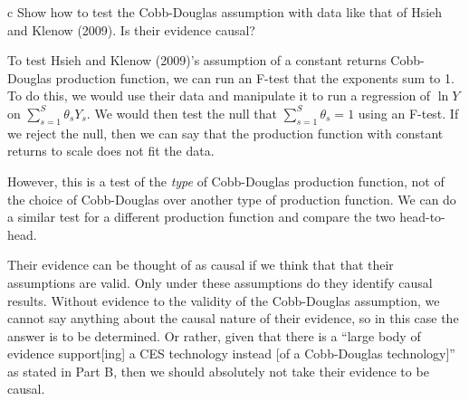 \documentclass{article}
\begin{document}
\begin{problem}{c}
Show how to test the Cobb-Douglas assumption with data like that of Hsieh and Klenow (2009). Is their evidence causal?
\end{problem}

To test Hsieh and Klenow (2009)'s assumption of a constant returns Cobb-Douglas production function, we can run an F-test that the exponents sum to 1. To do this, we would use their data and manipulate it to run a regression of $\ln Y$ on $ \sum_{s=1}^S \theta_s Y_s$. We would then test the null that $\sum_{s=1}^S \theta_s = 1$ using an F-test. If we reject the null, then we can say that the production function with constant returns to scale does not fit the data. 

However, this is a test of the \textit{type} of Cobb-Douglas production function, not of the choice of Cobb-Douglas over another type of production function. We can do a similar test for a different production function and compare the two head-to-head.

Their evidence can be thought of as causal if we think that that their assumptions are valid. Only under these assumptions do they identify causal results. Without evidence to the validity of the Cobb-Douglas assumption, we cannot say anything about the causal nature of their evidence, so in this case the answer is to be determined. Or rather, given that there is a ``large body of evidence support[ing] a CES technology instead [of a Cobb-Douglas technology]'' as stated in Part B, then we should absolutely not take their evidence to be causal.
\end{document}

